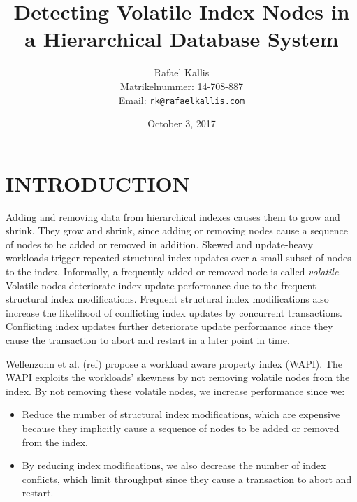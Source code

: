 \documentclass[abstracton,12pt]{scrreprt}
\title{Detecting Volatile Index Nodes in a Hierarchical Database System}
\author{
  Rafael Kallis\\[-5pt]
  \scriptsize Matrikelnummer: 14-708-887\\[-5pt]
  \scriptsize Email: \texttt{rk@rafaelkallis.com}
}
\date{\vspace*{2cm}October 3, 2017}
\begin{document}
\maketitle





\chapter{INTRODUCTION}

Adding and removing data from hierarchical indexes causes them to grow and shrink.
They grow and shrink, since adding or removing nodes cause a sequence of nodes to be added or removed in addition.
Skewed and update-heavy workloads trigger repeated structural index updates over a small subset of nodes to the index.
Informally, a frequently added or removed node is called \textit{volatile}.
Volatile nodes deteriorate index update performance due to the frequent structural index modifications.
Frequent structural index modifications also increase the likelihood of conflicting index updates by concurrent transactions.
Conflicting index updates further deteriorate update performance since they cause the transaction to abort and restart in a later point in time.


Wellenzohn et al. (ref) propose a workload aware property index (WAPI). 
The WAPI exploits the workloads' skewness by not removing volatile nodes from the index.
By not removing these volatile nodes, we increase performance since we:
\begin{itemize}
    \item Reduce the number of structural index modifications, which are expensive because they implicitly cause a sequence of nodes to be added or removed from the index.
    \item By reducing index modifications, we also decrease the number of index conflicts, which limit throughput since they cause a transaction to abort and restart.
\end{itemize}
\end{document}
